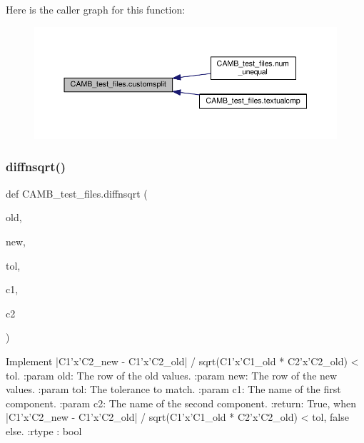 Here is the caller graph for this function\+:
\nopagebreak
\begin{figure}[H]
\begin{center}
\leavevmode
\includegraphics[width=350pt]{namespaceCAMB__test__files_a279603bcda2879c085f8dc09c58baa73_icgraph}
\end{center}
\end{figure}
\mbox{\label{namespaceCAMB__test__files_a64d237c051d366401dcdc40415829dca}} 
\subsubsection{\texorpdfstring{diffnsqrt()}{diffnsqrt()}}
{\footnotesize\ttfamily def C\+A\+M\+B\+\_\+test\+\_\+files.\+diffnsqrt (\begin{DoxyParamCaption}\item[{}]{old,  }\item[{}]{new,  }\item[{}]{tol,  }\item[{}]{c1,  }\item[{}]{c2 }\end{DoxyParamCaption})}

\begin{DoxyVerb}Implement |C1'x'C2_{new} - C1'x'C2_{old}| / sqrt(C1'x'C1_{old} * C2'x'C2_{old}) < tol.
:param old: The row of the old values.
:param new: The row of the new values.
:param tol: The tolerance to match.
:param c1: The name of the first component.
:param c2: The name of the second component.
:return: True, when |C1'x'C2_{new} - C1'x'C2_{old}| / sqrt(C1'x'C1_{old} * C2'x'C2_{old}) < tol, false else.
:rtype : bool
\end{DoxyVerb}
 \mbox{\label{namespaceCAMB__test__files_a0191b8bd66eb62d12d53cb0c2267074e}} 
